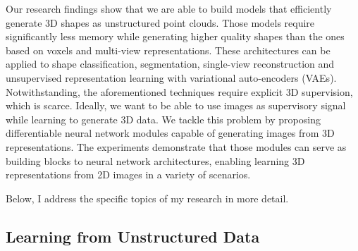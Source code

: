 Our research findings show that we are able to build models that efficiently generate 3D shapes as unstructured point clouds.
Those models require significantly less memory while generating higher quality shapes than the ones based
on voxels and multi-view representations.
These architectures can be applied to shape classification, segmentation, single-view reconstruction and
unsupervised representation learning with variational auto-encoders (VAEs).
Notwithstanding, the aforementioned techniques require explicit 3D supervision, which is scarce.
Ideally, we want to be able to use images as supervisory signal while learning to generate 3D data.
We tackle this problem by proposing differentiable neural network modules capable of generating images from 3D representations.
The experiments demonstrate that those modules can serve as building blocks to neural network architectures, enabling learning 3D representations from 2D images in a variety of scenarios.

Below, I address the specific topics of my research in more detail.

\subsection*{Learning from Unstructured Data}

